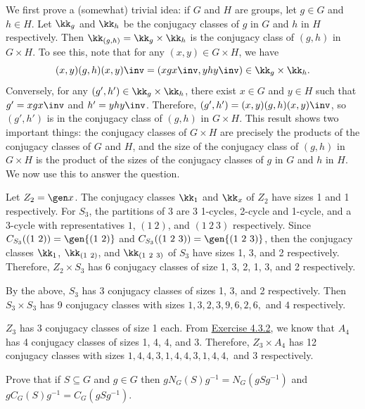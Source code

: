 \begin{sol}
	We first prove a (somewhat) trivial idea: if $G$ and $H$ are groups, let $g \in G$ and $h \in H$. Let $\kk_g$ and $\kk_h$ be the conjugacy classes of $g$ in $G$ and $h$ in $H$ respectively. Then $\kk_{(g,h)} = \kk_g \times \kk_h$ is the conjugacy class of $(g,h)$ in $G \times H$. To see this, note that for any $(x,y) \in G \times H$, we have
	\[(x,y)(g,h)(x,y)\inv = (xgx\inv, yhy\inv) \in \kk_g \times \kk_h.\]
	Conversely, for any $(g', h') \in \kk_g \times \kk_h$, there exist $x \in G$ and $y \in H$ such that $g' = xgx\inv$ and $h' = yhy\inv$. Therefore, $(g', h') = (x,y)(g,h)(x,y)\inv$, so $(g', h')$ is in the conjugacy class of $(g,h)$ in $G \times H$. This result shows two important things: the conjugacy classes of $G \times H$ are precisely the products of the conjugacy classes of $G$ and $H$, and the size of the conjugacy class of $(g,h)$ in $G \times H$ is the product of the sizes of the conjugacy classes of $g$ in $G$ and $h$ in $H$. We now use this to answer the question.
	\begin{subproblems}
		\item Let $Z_2 = \gen x$. The conjugacy classes $\kk_1$ and $\kk_x$ of $Z_2$ have sizes 1 and 1 respectively. For $S_3$, the partitions of 3 are 3 1-cycles, 2-cycle and 1-cycle, and a 3-cycle with representatives $1$, $(1\ 2)$, and $(1\ 2\ 3)$ respectively. Since $C_{S_3}((1\ 2)) = \gen{(1\ 2)}$ and $C_{S_3}((1\ 2\ 3)) = \gen{(1\ 2\ 3)}$, then the conjugacy classes $\kk_1$, $\kk_{(1\ 2)}$, and $\kk_{(1\ 2\ 3)}$ of $S_3$ have sizes 1, 3, and 2 respectively. Therefore, $Z_2 \times S_3$ has 6 conjugacy classes of size 1, 3, 2, 1, 3, and 2 respectively.
		\item By the above, $S_3$ has 3 conjugacy classes of sizes 1, 3, and 2 respectively. Then $S_3 \times S_3$ has 9 conjugacy classes with sizes $1, 3, 2, 3, 9, 6, 2, 6,$ and $4$ respectively.
		\item $Z_3$ has 3 conjugacy classes of size 1 each. From \hyperref[ex4.3.2]{Exercise 4.3.2}, we know that $A_4$ has 4 conjugacy classes of sizes 1, 4, 4, and 3. Therefore, $Z_3 \times A_4$ has 12 conjugacy classes with sizes $1, 4, 4, 3, 1, 4, 4, 3, 1, 4, 4,$ and $3$ respectively. \qh
	\end{subproblems}
\end{sol}

\begin{exercise}
	Prove that if $S \subseteq G$ and $g \in G$ then $gN_G(S)g^{-1} = N_G(gSg^{-1})$ and $gC_G(S)g^{-1} = C_G(gSg^{-1}).$
\end{exercise}

